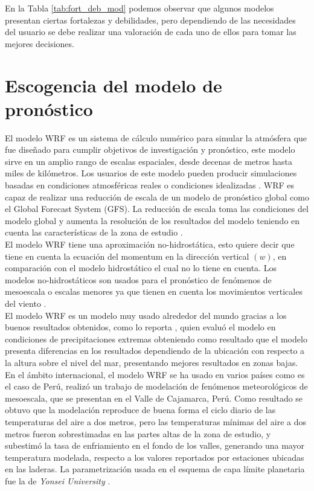 En la Tabla \ref{tab:fort_deb_mod} podemos observar que algunos modelos presentan ciertas fortalezas y debilidades, pero dependiendo de las necesidades del usuario se debe realizar una valoración de cada uno de ellos para tomar las mejores decisiones.


\section{Escogencia del modelo de pronóstico}

El modelo WRF es un sistema de cálculo numérico para simular la atmósfera que fue diseñado para cumplir objetivos de investigación y pronóstico, este modelo sirve en un amplio rango de escalas espaciales, desde decenas de metros hasta miles de kilómetros. Los usuarios de este modelo pueden producir simulaciones basadas en condiciones atmosféricas reales o condiciones idealizadas \citep{Pielke2002}. WRF es capaz de realizar una reducción de escala de un modelo de pronóstico global como el Global Forecast System (GFS). La reducción de escala toma las condiciones del modelo global y aumenta la resolución de los resultados del modelo teniendo en cuenta las características de la zona de estudio \citep{Sene2010}.\\

El modelo WRF tiene una aproximación no-hidrostática, esto quiere decir que tiene en cuenta la ecuación del momentum en la dirección vertical $(w)$, en comparación con el modelo hidrostático el cual no lo tiene en cuenta. Los modelos no-hidrostáticos son usados para el pronóstico de fenómenos de mesoescala o escalas menores \citep{Pielke2002, Sene2010} ya que tienen en cuenta los movimientos verticales del viento \citep{ArmentaPorras2013}.\\

El modelo WRF es un modelo muy usado alrededor del mundo gracias a los buenos resultados obtenidos, como lo reporta \citet{Jimenez2014}, quien evaluó el modelo en condiciones de precipitaciones extremas obteniendo como resultado que el modelo presenta diferencias en los resultados dependiendo de la ubicación con respecto a la altura sobre el nivel del mar, presentando mejores resultados en zonas bajas. En el ámbito internacional, el modelo WRF se ha usado en varios países como es el caso de Perú, \citet{Saavedra2016} realizó un trabajo de modelación de fenómenos meteorológicos de mesoescala, que se presentan en el Valle de Cajamarca, Perú. Como resultado se obtuvo que la modelación reproduce de buena forma el ciclo diario de las temperaturas del aire a dos metros, pero las temperaturas mínimas del aire a dos metros fueron sobrestimadas en las partes altas de la zona de estudio, y subestimó la tasa de enfriamiento en el fondo de los valles, generando una mayor temperatura modelada, respecto a los valores reportados por estaciones ubicadas en las laderas. La parametrización usada en el esquema de capa límite planetaria fue la de \textit{Yonsei University} \citep{Hong2006}.\\

